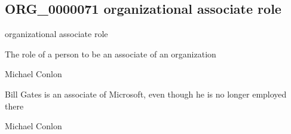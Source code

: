 \documentclass[letterpaper,10pt,english]{sphinxmanual}
\begin{document}
\subsection{ORG\_0000071 \sphinxhyphen{} organizational associate role}
\label{\detokenize{doc-ORG_0000071:org-0000071-organizational-associate-role}}\label{\detokenize{doc-ORG_0000071:index-0}}\label{\detokenize{doc-ORG_0000071::doc}}
\begin{sphinxShadowBox}

\sphinxAtStartPar
organizational associate role
\end{sphinxShadowBox}

\begin{sphinxShadowBox}

\sphinxAtStartPar
{\hyperref[\detokenize{doc-BFO_0000023::doc}]{}}
\end{sphinxShadowBox}

\begin{sphinxShadowBox}

\sphinxAtStartPar
The role of a person to be an associate of an organization
\end{sphinxShadowBox}

\begin{sphinxShadowBox}

\sphinxAtStartPar
Michael Conlon 
\end{sphinxShadowBox}

\begin{sphinxShadowBox}

\sphinxAtStartPar
Bill Gates is an associate of Microsoft, even though he is no longer employed there
\end{sphinxShadowBox}

\begin{sphinxShadowBox}

\sphinxAtStartPar
Michael Conlon 
\end{sphinxShadowBox}
\begin{quote}

\ignorespaces \end{quote}
\end{document}

